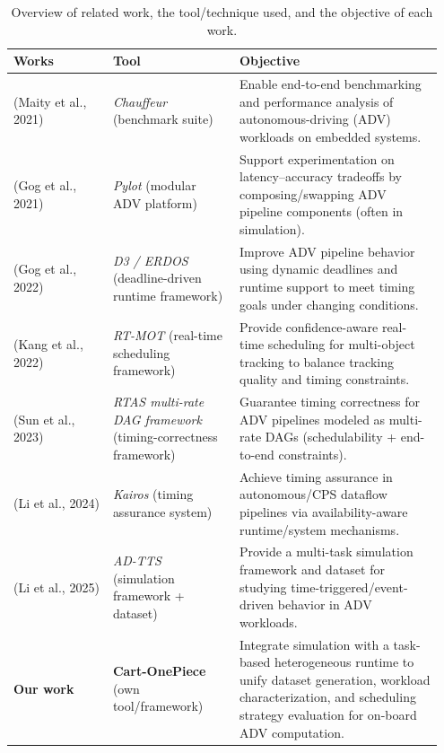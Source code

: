 \begin{table}[t]
\centering
\small
\setlength{\tabcolsep}{6pt}
\renewcommand{\arraystretch}{1.15}
\caption{Overview of related work, the tool/technique used, and the objective of each work.}
\label{tab:rw_overview_tools_objectives}
\begin{tabular}{p{0.22\linewidth} p{0.28\linewidth} p{0.45\linewidth}}
\hline
\textbf{Works} & \textbf{Tool} & \textbf{Objective} \\
\hline
(Maity et al., 2021) & \textit{Chauffeur} (benchmark suite) &
Enable end-to-end benchmarking and performance analysis of autonomous-driving (ADV) workloads on embedded systems. \\
\hline
(Gog et al., 2021) & \textit{Pylot} (modular ADV platform) &
Support experimentation on latency--accuracy tradeoffs by composing/swapping ADV pipeline components (often in simulation). \\
\hline
(Gog et al., 2022) & \textit{D3 / ERDOS} (deadline-driven runtime framework) &
Improve ADV pipeline behavior using dynamic deadlines and runtime support to meet timing goals under changing conditions. \\
\hline
(Kang et al., 2022) & \textit{RT-MOT} (real-time scheduling framework) &
Provide confidence-aware real-time scheduling for multi-object tracking to balance tracking quality and timing constraints. \\
\hline
(Sun et al., 2023) & \textit{RTAS multi-rate DAG framework} (timing-correctness framework) &
Guarantee timing correctness for ADV pipelines modeled as multi-rate DAGs (schedulability + end-to-end constraints). \\
\hline
(Li et al., 2024) & \textit{Kairos} (timing assurance system) &
Achieve timing assurance in autonomous/CPS dataflow pipelines via availability-aware runtime/system mechanisms. \\
\hline
(Li et al., 2025) & \textit{AD-TTS} (simulation framework + dataset) &
Provide a multi-task simulation framework and dataset for studying time-triggered/event-driven behavior in ADV workloads. \\
\hline
\textbf{Our work} & \textbf{Cart-OnePiece} (own tool/framework) &
Integrate simulation with a task-based heterogeneous runtime to unify dataset generation, workload characterization, and scheduling strategy evaluation for on-board ADV computation. \\
\hline
\end{tabular}
\end{table}


